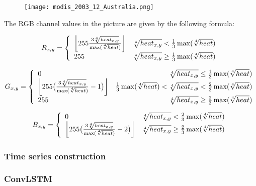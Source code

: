 \documentclass[
]{article}
\begin{document}
\begin{figure}
\centering
\texttt{[image: modis\_2003\_12\_Australia.png]}
\caption{}
\end{figure}

The RGB channel values in the picture are given by the following
formula:

\begin{equation}
R_{x,y}=\left\{
\begin{array}{lr}
\left \lfloor 255\frac{3\root4\of{{heat}_{x,y}}}{\max(\root4\of {heat})} \right \rfloor & \root4\of{{heat}_{x,y}}<\frac{1}{3}\max(\root4\of {heat})  \\  
255 & \root4\of{{heat}_{x,y}}\ge\frac{1}{3}\max(\root4\of {heat})
\end{array}  
\right.
\end{equation}

\begin{equation}
G_{x,y}=\left\{
\begin{array}{lr}
0&\root4\of{{heat}_{x,y}}\le\frac{1}{3}\max(\root4\of {heat})\\
\left \lfloor 255\big(\frac{3\root4\of{{heat}_{x,y}}}{\max(\root4\of {heat})}-1\big) \right \rfloor&\frac{1}{3}\max(\root4\of {heat})<\root4\of{{heat}_{x,y}}<\frac{2}{3}\max(\root4\of {heat})  \\  
255&\root4\of{{heat}_{x,y}}\ge\frac{2}{3}\max(\root4\of {heat})
\end{array}  
\right.
\end{equation}

\begin{equation}
B_{x,y}=\left\{
\begin{array}{lr}
0&\root4\of{{heat}_{x,y}}<\frac{2}{3}\max(\root4\of {heat})\\
\left \lfloor 255\big(\frac{3\root4\of{{heat}_{x,y}}}{\max(\root4\of {heat})}-2\big) \right \rfloor&\root4\of{{heat}_{x,y}}\ge\frac{2}{3}\max(\root4\of {heat})  
\end{array}  
\right.
\end{equation}

\hypertarget{time-series-construction}{%
\subsubsection{Time series
construction}\label{time-series-construction}}

\hypertarget{convlstm}{%
\subsubsection{ConvLSTM}\label{convlstm}}
\end{document}
